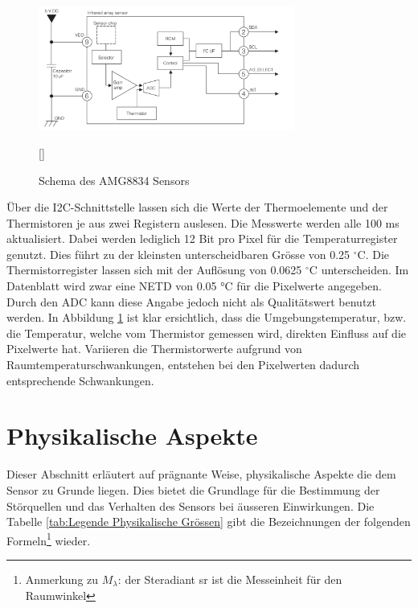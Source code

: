 \begin{figure}[H]
	\centering
	\includegraphics[width=0.75\textwidth]
	{fig/Circuit_AMG8834.PNG}
	\caption[Schema des AMG8834 Sensors]{Schema des AMG8834 Sensors} [\protect\cite{AMG8834}]
	\label{fig:SchemaAMG8834}
\end{figure}
 
Über die \ac{I2C}-Schnittstelle lassen sich die Werte der Thermoelemente und der Thermistoren je aus zwei Registern auslesen. Die Messwerte werden alle 100 ms aktualisiert. Dabei werden lediglich 12 Bit pro Pixel für die Temperaturregister genutzt. Dies führt zu der kleinsten unterscheidbaren Grösse von 0.25 $^\circ$C. Die Thermistorregister lassen sich mit der Auflösung von 0.0625 $^\circ$C unterscheiden. Im Datenblatt wird zwar eine \ac{NETD} von 0.05 °C für die Pixelwerte angegeben. Durch den \ac{ADC} kann diese Angabe jedoch nicht als Qualitätswert benutzt werden.
In Abbildung \ref{fig:SchemaAMG8834} ist klar ersichtlich, dass die Umgebungstemperatur, bzw. die Temperatur, welche vom Thermistor gemessen wird, direkten Einfluss auf die Pixelwerte hat. Variieren die Thermistorwerte aufgrund von Raumtemperaturschwankungen, entstehen bei den Pixelwerten dadurch entsprechende Schwankungen.

\section{Physikalische Aspekte}
\label{sec:Physik}
Dieser Abschnitt erläutert auf prägnante Weise, physikalische Aspekte die dem Sensor zu Grunde liegen. Dies bietet die Grundlage für die Bestimmung der Störquellen und das Verhalten des Sensors bei äusseren Einwirkungen. Die Tabelle \ref{tab:Legende Physikalische Grössen} gibt die Bezeichnungen der folgenden Formeln\footnote[2]{Anmerkung zu $M_{\lambda }$: der Steradiant sr ist die Messeinheit für den Raumwinkel} wieder.

